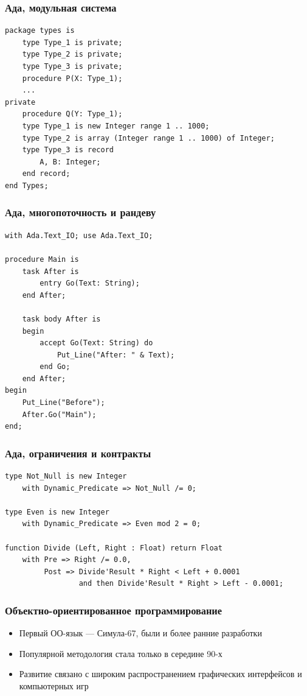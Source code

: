 \documentclass[xetex,mathserif,serif]{beamer}
\begin{document}
    \begin{frame}[fragile]
        \frametitle{Ада, модульная система}
        \begin{verbatim}
package types is
    type Type_1 is private;
    type Type_2 is private;
    type Type_3 is private;
    procedure P(X: Type_1);
    ...
private
    procedure Q(Y: Type_1);
    type Type_1 is new Integer range 1 .. 1000;
    type Type_2 is array (Integer range 1 .. 1000) of Integer;
    type Type_3 is record
        A, B: Integer;
    end record;
end Types;
        \end{verbatim}
    \end{frame}

    \begin{frame}[fragile]
        \frametitle{Ада, многопоточность и рандеву}
        \begin{small}
            \begin{verbatim}
with Ada.Text_IO; use Ada.Text_IO;

procedure Main is
    task After is
        entry Go(Text: String);
    end After;

    task body After is
    begin
        accept Go(Text: String) do
            Put_Line("After: " & Text);
        end Go;
    end After;
begin
    Put_Line("Before");
    After.Go("Main");
end;
            \end{verbatim}
        \end{small}
    \end{frame}

    \begin{frame}[fragile]
        \frametitle{Ада, ограничения и контракты}
        \begin{verbatim}
type Not_Null is new Integer
    with Dynamic_Predicate => Not_Null /= 0;

type Even is new Integer
    with Dynamic_Predicate => Even mod 2 = 0;

function Divide (Left, Right : Float) return Float
    with Pre => Right /= 0.0,
         Post => Divide'Result * Right < Left + 0.0001
                 and then Divide'Result * Right > Left - 0.0001;
        \end{verbatim}
    \end{frame}

    \begin{frame}
        \frametitle{Объектно-ориентированное программирование}
        \begin{itemize}
            \item Первый ОО-язык --- Симула-67, были и более ранние разработки
            \item Популярной методология стала только в середине 90-х
            \item Развитие связано с широким распространением графических интерфейсов и компьютерных игр
        \end{itemize}
    \end{frame}
\end{document}
